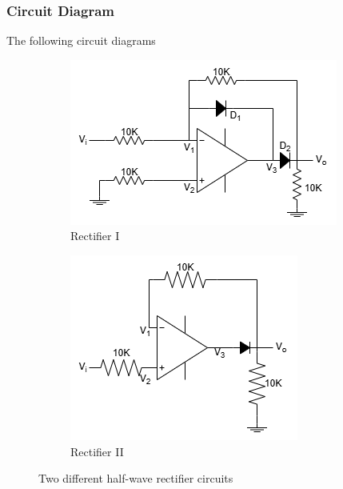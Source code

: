     \subsubsection{Circuit Diagram}
        The following circuit diagrams 
        \begin{figure}[H]
            \centering
            \begin{subfigure}{0.4\textwidth}
                \includegraphics[width=1\linewidth]{Experiment_12/Circuit/Lab12a.drawio.png}
                \caption{Rectifier I}
                \label{cir:12a}
            \end{subfigure}
            \begin{subfigure}{0.4\textwidth}
                \includegraphics[width=1\linewidth]{Experiment_12/Circuit/Lab12b.drawio.png}
                \caption{Rectifier II}
                \label{cir:12b}
            \end{subfigure}
            \caption{Two different half-wave rectifier circuits}
        \end{figure}


